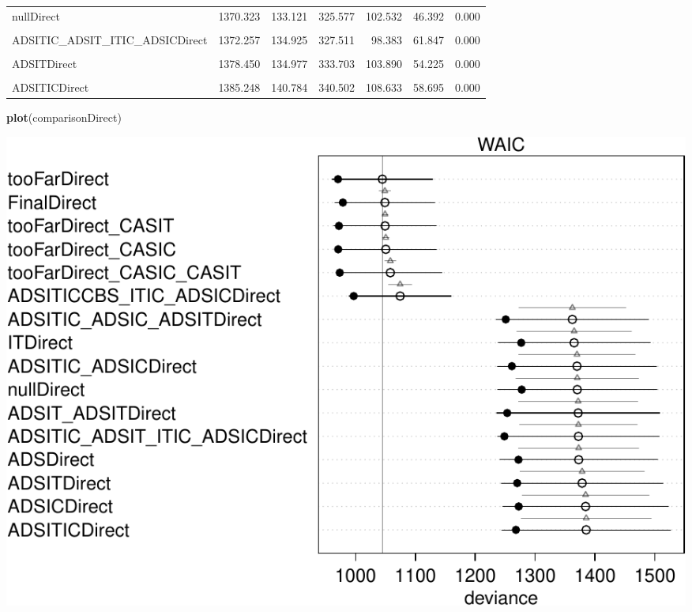 \documentclass[10pt,dvipsnames,enabledeprecatedfontcommands]{scrartcl}
\newenvironment{Shaded}{\begin{snugshade}}{\end{snugshade}}
\newcommand{\KeywordTok}[1]{\textcolor[rgb]{0.13,0.29,0.53}{\textbf{#1}}}
\newcommand{\NormalTok}[1]{#1}
\begin{document}
\begin{table}
{\begin{tabular}{lrrrrrr}
nullDirect & 1370.323 & 133.121 & 325.577 & 102.532 & 46.392 & 0.000\\
\addlinespace
\cellcolor{gray!6}{\cellcolor{gray!6}{ADSIT\_ADSITDirect}} & \cellcolor{gray!6}{\cellcolor{gray!6}{1371.846}} & \cellcolor{gray!6}{\cellcolor{gray!6}{136.213}} & \cellcolor{gray!6}{\cellcolor{gray!6}{327.100}} & \cellcolor{gray!6}{\cellcolor{gray!6}{99.520}} & \cellcolor{gray!6}{\cellcolor{gray!6}{59.273}} & \cellcolor{gray!6}{\cellcolor{gray!6}{0.000}}\\
ADSITIC\_ADSIT\_ITIC\_ADSICDirect & 1372.257 & 134.925 & 327.511 & 98.383 & 61.847 & 0.000\\
\cellcolor{gray!6}{\cellcolor{gray!6}{ADSDirect}} & \cellcolor{gray!6}{\cellcolor{gray!6}{1372.713}} & \cellcolor{gray!6}{\cellcolor{gray!6}{131.716}} & \cellcolor{gray!6}{\cellcolor{gray!6}{327.966}} & \cellcolor{gray!6}{\cellcolor{gray!6}{100.481}} & \cellcolor{gray!6}{\cellcolor{gray!6}{50.297}} & \cellcolor{gray!6}{\cellcolor{gray!6}{0.000}}\\
ADSITDirect & 1378.450 & 134.977 & 333.703 & 103.890 & 54.225 & 0.000\\
\cellcolor{gray!6}{\cellcolor{gray!6}{ADSICDirect}} & \cellcolor{gray!6}{\cellcolor{gray!6}{1384.285}} & \cellcolor{gray!6}{\cellcolor{gray!6}{138.312}} & \cellcolor{gray!6}{\cellcolor{gray!6}{339.538}} & \cellcolor{gray!6}{\cellcolor{gray!6}{106.092}} & \cellcolor{gray!6}{\cellcolor{gray!6}{55.895}} & \cellcolor{gray!6}{\cellcolor{gray!6}{0.000}}\\
\addlinespace
ADSITICDirect & 1385.248 & 140.784 & 340.502 & 108.633 & 58.695 & 0.000\\
\bottomrule
\end{tabular}}
\endgroup{}
\end{table}

\begin{Shaded}
\begin{Highlighting}[]
\KeywordTok{plot}\NormalTok{(comparisonDirect)}
\end{Highlighting}
\end{Shaded}

\begin{center}\includegraphics[width=1\linewidth]{bayesianReport3_files/figure-latex/comparisonDirectModels-1} \end{center}
\end{document}
